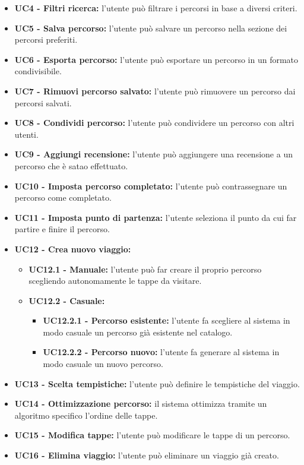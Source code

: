 \begin{itemize}
    \item \textbf{UC4 - Filtri ricerca:} l'utente può filtrare i percorsi in base a diversi criteri.

    \item \textbf{UC5 - Salva percorso:} l'utente può salvare un percorso nella sezione dei percorsi preferiti.

    \item \textbf{UC6 - Esporta percorso:} l'utente può esportare un percorso in un formato condivisibile.

    \item \textbf{UC7 - Rimuovi percorso salvato:} l'utente può rimuovere un percorso dai percorsi salvati.

    \item \textbf{UC8 - Condividi percorso:} l'utente può condividere un percorso con altri utenti.

    \item \textbf{UC9 - Aggiungi recensione:} l'utente può aggiungere una recensione a un percorso che è satao effettuato.

    \item \textbf{UC10 - Imposta percorso completato:} l'utente può contrassegnare un percorso come completato.

    \item \textbf{UC11 - Imposta punto di partenza:} l'utente seleziona il punto da cui far partire e finire il percorso.

    \item \textbf{UC12 - Crea nuovo viaggio:} 
\begin{itemize}
     \item \textbf{UC12.1 - Manuale:} l'utente può far creare il proprio percorso scegliendo autonomamente le tappe da visitare.
 \item \textbf{UC12.2 - Casuale:} 
\begin{itemize}
   \item \textbf{UC12.2.1 - Percorso esistente:} l'utente fa scegliere al sistema in modo casuale un percorso già esistente nel catalogo.
    \item \textbf{UC12.2.2 - Percorso nuovo:} l'utente fa generare al sistema in modo casuale un nuovo percorso.
\end{itemize}
\end{itemize} 

    \item \textbf{UC13 - Scelta tempistiche:} l'utente può definire le tempistiche del viaggio.

    \item \textbf{UC14 - Ottimizzazione percorso:} il sistema ottimizza tramite un algoritmo specifico l’ordine delle tappe.

    \item \textbf{UC15 - Modifica tappe:} l'utente può modificare le tappe di un percorso.

    \item \textbf{UC16 - Elimina viaggio:} l'utente può eliminare un viaggio già creato.
\end{itemize}
